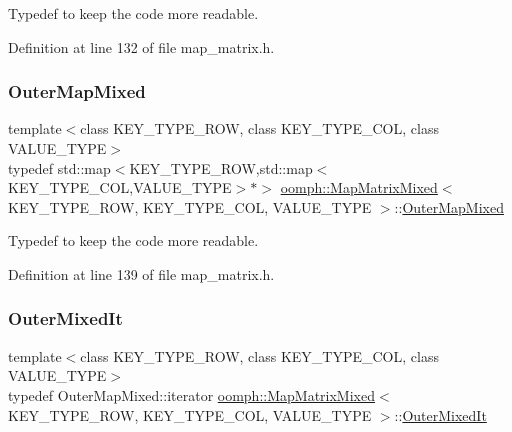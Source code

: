 Typedef to keep the code more readable. 



Definition at line 132 of file map\+\_\+matrix.\+h.

\mbox{\label{classoomph_1_1MapMatrixMixed_accfdbc5eed007b560e52b4ce77c11680}} 
\subsubsection{\texorpdfstring{Outer\+Map\+Mixed}{OuterMapMixed}}
{\footnotesize\ttfamily template$<$class K\+E\+Y\+\_\+\+T\+Y\+P\+E\+\_\+\+R\+OW, class K\+E\+Y\+\_\+\+T\+Y\+P\+E\+\_\+\+C\+OL, class V\+A\+L\+U\+E\+\_\+\+T\+Y\+PE$>$ \\
typedef std\+::map$<$K\+E\+Y\+\_\+\+T\+Y\+P\+E\+\_\+\+R\+OW,std\+::map$<$K\+E\+Y\+\_\+\+T\+Y\+P\+E\+\_\+\+C\+OL,V\+A\+L\+U\+E\+\_\+\+T\+Y\+PE$>$$\ast$$>$ \hyperlink{classoomph_1_1MapMatrixMixed}{oomph\+::\+Map\+Matrix\+Mixed}$<$ K\+E\+Y\+\_\+\+T\+Y\+P\+E\+\_\+\+R\+OW, K\+E\+Y\+\_\+\+T\+Y\+P\+E\+\_\+\+C\+OL, V\+A\+L\+U\+E\+\_\+\+T\+Y\+PE $>$\+::\hyperlink{classoomph_1_1MapMatrixMixed_accfdbc5eed007b560e52b4ce77c11680}{Outer\+Map\+Mixed}}



Typedef to keep the code more readable. 



Definition at line 139 of file map\+\_\+matrix.\+h.

\mbox{\label{classoomph_1_1MapMatrixMixed_ae9b361be3e0ce68e8f6618b95cbad231}} 
\subsubsection{\texorpdfstring{Outer\+Mixed\+It}{OuterMixedIt}}
{\footnotesize\ttfamily template$<$class K\+E\+Y\+\_\+\+T\+Y\+P\+E\+\_\+\+R\+OW, class K\+E\+Y\+\_\+\+T\+Y\+P\+E\+\_\+\+C\+OL, class V\+A\+L\+U\+E\+\_\+\+T\+Y\+PE$>$ \\
typedef Outer\+Map\+Mixed\+::iterator \hyperlink{classoomph_1_1MapMatrixMixed}{oomph\+::\+Map\+Matrix\+Mixed}$<$ K\+E\+Y\+\_\+\+T\+Y\+P\+E\+\_\+\+R\+OW, K\+E\+Y\+\_\+\+T\+Y\+P\+E\+\_\+\+C\+OL, V\+A\+L\+U\+E\+\_\+\+T\+Y\+PE $>$\+::\hyperlink{classoomph_1_1MapMatrixMixed_ae9b361be3e0ce68e8f6618b95cbad231}{Outer\+Mixed\+It}}



